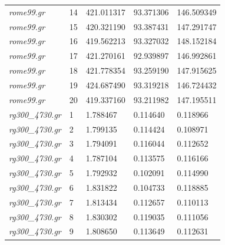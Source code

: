 \documentclass[12pt]{article}
\begin{document}
\begin{longtable}{l|l|lll}
\textit{rome99.gr}               &  14       & 421.011317             & 93.371306            & 146.509349                   \\
\textit{rome99.gr}               &  15       & 420.321190             & 93.387431            & 147.291747                   \\
\textit{rome99.gr}               &  16       & 419.562213             & 93.327032            & 148.152184                   \\
\textit{rome99.gr}               &  17       & 421.270161             & 92.939897            & 146.992861                   \\
\textit{rome99.gr}               &  18       & 421.778354             & 93.259190            & 147.915625                   \\
\textit{rome99.gr}               &  19       & 424.687490             & 93.319218            & 146.724432                   \\
\textit{rome99.gr}               &  20       & 419.337160             & 93.211982            & 147.195511                   \\ \hline
\textit{rg300\_4730.gr}          &  1        & 1.788467               & 0.114640             & 0.118966                     \\
\textit{rg300\_4730.gr}          &  2        & 1.799135               & 0.114424             & 0.108971                     \\
\textit{rg300\_4730.gr}          &  3        & 1.794091               & 0.116044             & 0.112652                     \\
\textit{rg300\_4730.gr}          &  4        & 1.787104               & 0.113575             & 0.116166                     \\
\textit{rg300\_4730.gr}          &  5        & 1.792932               & 0.102091             & 0.114990                     \\
\textit{rg300\_4730.gr}          &  6        & 1.831822               & 0.104733             & 0.118885                     \\
\textit{rg300\_4730.gr}          &  7        & 1.813434               & 0.112657             & 0.110113                     \\
\textit{rg300\_4730.gr}          &  8        & 1.830302               & 0.119035             & 0.111056                     \\
\textit{rg300\_4730.gr}          &  9        & 1.808650               & 0.113649             & 0.112631                     \\

\end{longtable}
\end{document}
